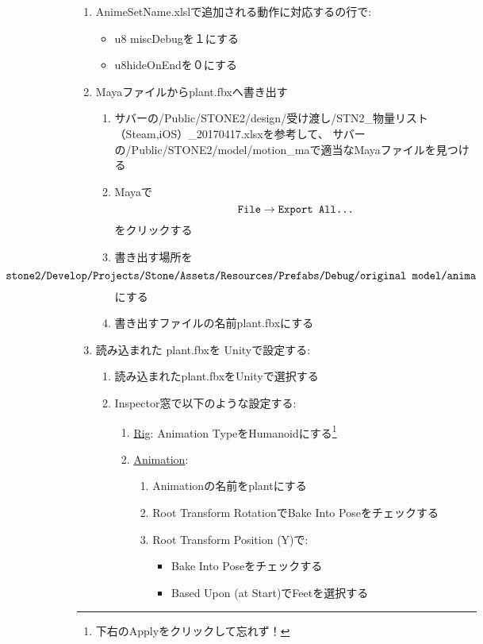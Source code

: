 \documentclass[a4paper]{report}
\newcommand{\tname}{{\ttfamily AnimeSetName.xlsl}}
\newcommand{\fbxname}{{\ttfamily plant.fbx}}
\begin{document}
\begin{enumerate}
	\item \tname で追加される動作に対応するの行で:\begin{itemize}
			\item u8 miscDebugを１にする
			\item u8hideOnEndを０にする
		\end{itemize}
	\item Mayaファイルから{\ttfamily plant.fbx}へ書き出す\begin{enumerate}
			\item サバーの{\ttfamily /Public/STONE2/design/受け渡し/STN2\_物量リスト（Steam,iOS）\_20170417.xlsx}を参考して、
				サバーの{\ttfamily /Public/STONE2/model/motion\_ma}で適当なMayaファイルを見つける
			\item Mayaで\begin{equation*}
					\mbox{\ttfamily File}\to\mbox{\ttfamily Export All\dots}
				\end{equation*}をクリックする
			\item 書き出す場所を
				\begin{equation*}
					\kern-7cm\mbox{\ttfamily
C:/cygwin/home/AJP/stone2/Develop/Projects/Stone/Assets/Resources/Prefabs/Debug/original model/anima}
				\end{equation*}にする
			\item 書き出すファイルの名前\fbxname にする
		\end{enumerate}
	\item 読み込まれた \fbxname を Unityで設定する:
	\begin{enumerate}
		\item 読み込まれた\fbxname をUnityで選択する
		\item Inspector窓で以下のような設定する:
			\begin{enumerate}
				\item \underline{Rig}: Animation TypeをHumanoidにする\footnote{下右のApplyをクリックして忘れず！}
				\item \underline{Animation}:
					\begin{enumerate}
						\item Animationの名前をplantにする
						\item Root Transform RotationでBake Into Poseをチェックする
						\item Root Transform Position (Y)で:\begin{itemize}
								\item Bake Into Poseをチェックする
								\item Based Upon (at Start)でFeetを選択する

\end{itemize}
\end{enumerate}
\end{enumerate}
\end{enumerate}
\end{enumerate}
\end{document}

